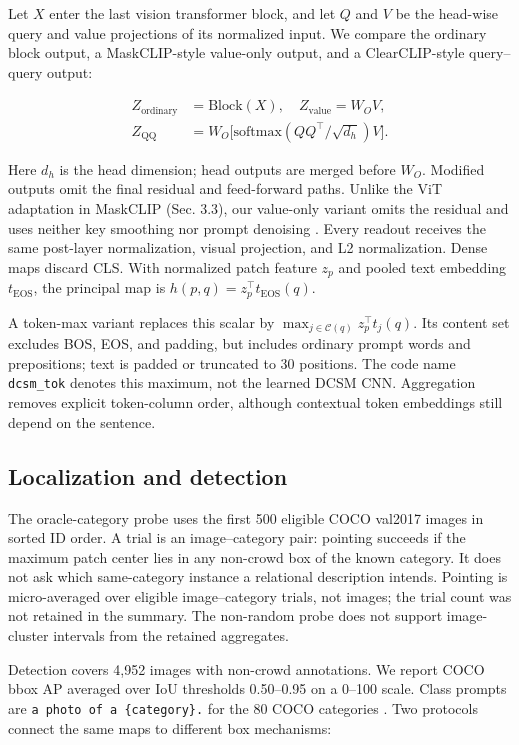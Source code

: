 \documentclass[10pt,twocolumn,letterpaper]{article}
\begin{document}
Let \(X\) enter the last vision transformer block, and let \(Q\) and
\(V\) be the head-wise query and value projections of its normalized
input. We compare the ordinary block output, a MaskCLIP-style value-only
output, and a ClearCLIP-style query--query output:

\[
\begin{aligned}
Z_{\mathrm{ordinary}}&=\mathrm{Block}(X),\quad Z_{\mathrm{value}}=W_O V,\\
Z_{\mathrm{QQ}}&=W_O\big[\mathrm{softmax}(QQ^\top/\sqrt{d_h})V\big].
\end{aligned}
\]

Here \(d_h\) is the head dimension; head outputs are merged before
\(W_O\). Modified outputs omit the final residual and feed-forward
paths. Unlike the ViT adaptation in MaskCLIP (Sec. 3.3), our value-only
variant omits the residual and uses neither key smoothing nor prompt
denoising \citep{zhou2021maskclip}. Every readout receives the same
post-layer normalization, visual projection, and L2 normalization. Dense
maps discard CLS. With normalized patch feature \(z_p\) and pooled text
embedding \(t_{\mathrm{EOS}}\), the principal map is
\(h(p,q)=z_p^\top t_{\mathrm{EOS}}(q)\).

A token-max variant replaces this scalar by
\(\max_{j\in\mathcal C(q)}z_p^\top t_j(q)\). Its content set excludes
BOS, EOS, and padding, but includes ordinary prompt words and
prepositions; text is padded or truncated to 30 positions. The code name
\texttt{dcsm\_tok} denotes this maximum, not the learned DCSM CNN.
Aggregation removes explicit token-column order, although contextual
token embeddings still depend on the sentence.

\subsection{Localization and
detection}\label{localization-and-detection}

The oracle-category probe uses the first 500 eligible COCO val2017
images in sorted ID order. A trial is an image--category pair: pointing
succeeds if the maximum patch center lies in any non-crowd box of the
known category. It does not ask which same-category instance a
relational description intends. Pointing is micro-averaged over eligible
image--category trials, not images; the trial count was not retained in
the summary. The non-random probe does not support image-cluster
intervals from the retained aggregates.

Detection covers 4,952 images with non-crowd annotations. We report COCO
bbox AP averaged over IoU thresholds 0.50--0.95 on a 0--100 scale. Class
prompts are \texttt{a\ photo\ of\ a\ \{category\}.} for the 80 COCO
categories \citep{lin2014coco}. Two protocols connect the same maps to
different box mechanisms:
\end{document}
